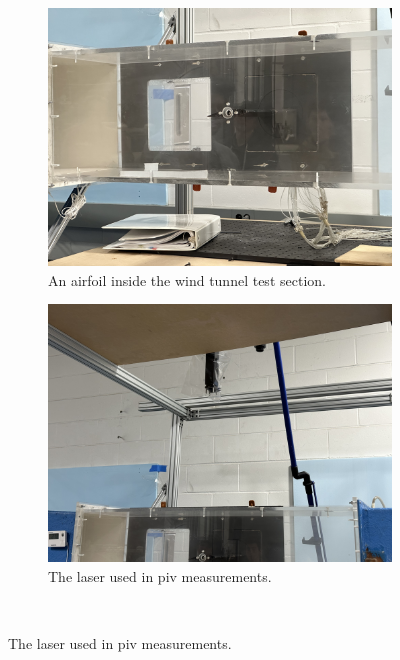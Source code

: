 \begin{figure}[htpb]
    \centering
    \begin{subfigure}{0.49\textwidth}
        \centering
        \includegraphics[width=\textwidth]{Figures/IMG_0127.jpeg}
        \caption{An airfoil inside the wind tunnel test section.}
        \label{fig:test_section}
    \end{subfigure}
    \begin{subfigure}{0.49\textwidth}
        \centering
        \includegraphics[width=\textwidth]{Figures/IMG_0130.jpeg}
        \caption{The laser used in \acrshort{piv} measurements.}
        \label{fig:laser}
    \end{subfigure} \\

\end{figure}
